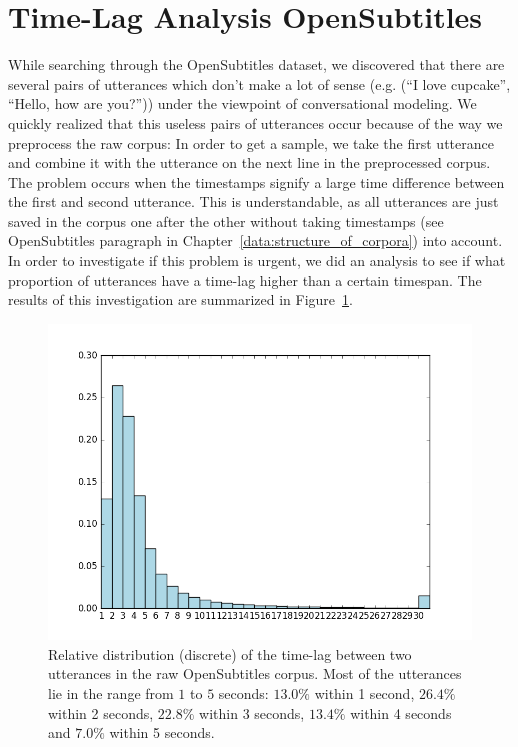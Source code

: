 \section{Time-Lag Analysis OpenSubtitles}
\label{data:opensubtitles:time_lag_analysis}
While searching through the OpenSubtitles dataset, we discovered that there are several pairs of utterances which don't make a lot of sense (e.g. (``I love cupcake'', ``Hello, how are you?'')) under the viewpoint of conversational modeling. We quickly realized that this useless pairs of utterances occur because of the way we preprocess the raw corpus: In order to get a sample, we take the first utterance and combine it with the utterance on the next line in the preprocessed corpus. The problem occurs when the timestamps signify a large time difference between the first and second utterance. This is understandable, as all utterances are just saved in the corpus one after the other without taking timestamps (see OpenSubtitles paragraph in Chapter~\ref{data:structure_of_corpora}) into account. In order to investigate if this problem is urgent, we did an analysis to see if what proportion of utterances have a time-lag higher than a certain timespan. The results of this investigation are summarized in Figure~\ref{fig:data:analyse:timediff:opus}.

\begin{figure}[H]
	\centering
	\includegraphics[width=15cm]{img/opus_time_analyze.PNG}
	\caption{Relative distribution (discrete) of the time-lag between two utterances in the raw OpenSubtitles corpus. Most of the utterances lie in the range from $1$ to $5$ seconds: $13.0\%$ within 1 second, $26.4\%$ within 2 seconds, $22.8\%$ within 3 seconds, $13.4\%$ within 4 seconds and  $7.0\%$ within 5 seconds.}
	\label{fig:data:analyse:timediff:opus}
\end{figure}

